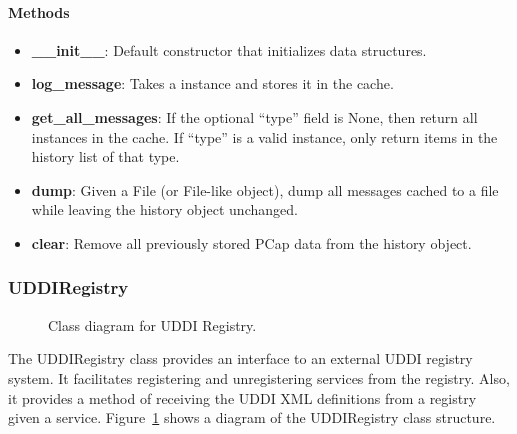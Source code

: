 \documentclass[titlepage]{article}
\newcommand{\umlclass}[5][,]{
    \node [umlclass,#1] (#2) {
        \textbf{#3}
        \nodepart{second}
        \begin{description*}
        #4
        \end{description*}
        \nodepart{third}
        \begin{description*}
        #5
        \end{description*}
    };
}
\newcommand{\umlattr}[3]{
    \item[$#1$]\textbf{#2}: \textit{#3}
}
\newcommand{\umlmethod}[4]{
    \item[$#1$]\textbf{#2}({#3}): \textit{#4}
}
\begin{document}
\paragraph{Methods}
\begin{itemize}
    \item \textbf{\_\_init\_\_}: Default constructor that initializes data
        structures.
    \item \textbf{log\_message}: Takes a  instance and
        stores it in the cache.
    \item \textbf{get\_all\_messages}: If the optional ``type'' field is None,
        then return all  instances in the cache.
        If ``type'' is a valid  instance, only
        return items in the history list of that type.
    \item \textbf{dump}: Given a File (or File-like object), dump all messages
        cached to a file while leaving the history object unchanged.
    \item \textbf{clear}: Remove all previously stored PCap data from the
        history object.
\end{itemize}


\subsubsection{UDDIRegistry
    \label{class-uddi-registry}
}

\begin{figure}
    \centering
    \caption{Class diagram for UDDI Registry.}
    \label{fig-kernel_uddi_registry}
\end{figure}

The UDDIRegistry class provides an interface to an external UDDI registry
system.  It facilitates registering and unregistering services from the
registry.  Also, it provides a method of receiving the UDDI XML definitions
from a registry given a service.  Figure~\ref{fig-kernel_uddi_registry} shows a
diagram of the UDDIRegistry class structure.
\end{document}
